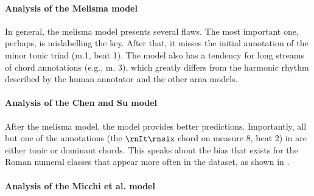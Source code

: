 \paragraph{Analysis of the Melisma model}

In general, the \gls{melisma} model presents several flaws.
The most important one, perhaps, is mislabelling the key.
After that, it misses the initial annotation of the minor
tonic triad (m.1, beat 1). The model also has a tendency for
long streams of chord annotations (e.g., m. 3), which
greatly differs from the harmonic rhythm described by the
human annotator and the other \gls{arna} models. 

\paragraph{Analysis of the Chen and Su model}

After the \gls{melisma} model, the \textcite{chen2021attend}
model provides better predictions. Importantly, all but one
of the annotations (the $\rnIt\rnsix$ chord on measure 8,
beat 2) in \textcite{chen2021attend} are either tonic or
dominant chords. This speaks about the bias that exists for
the Roman numeral classes that appear more often in the
dataset, as shown in . 

\paragraph{Analysis of the Micchi et al. model}


